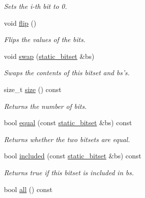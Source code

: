 \begin{DoxyCompactItemize}
\begin{DoxyCompactList}\small\item\em Sets the {\itshape i-\/th} bit to 0. \end{DoxyCompactList}\item 
void \hyperlink{classlgraph_1_1utils_1_1static__bitset_a430b19330c6f2a77f6ee15c3d652a2d6}{flip} ()
\begin{DoxyCompactList}\small\item\em Flips the values of the bits. \end{DoxyCompactList}\item 
void \hyperlink{classlgraph_1_1utils_1_1static__bitset_ae1737eb8f5aed69b6dd69c75334ef23a}{swap} (\hyperlink{classlgraph_1_1utils_1_1static__bitset}{static\-\_\-bitset} \&bs)
\begin{DoxyCompactList}\small\item\em Swaps the contents of this bitset and {\itshape bs's}. \end{DoxyCompactList}\item 
size\-\_\-t \hyperlink{classlgraph_1_1utils_1_1static__bitset_a5e48518dc9d46c06338166c85f5f2cc3}{size} () const 
\begin{DoxyCompactList}\small\item\em Returns the number of bits. \end{DoxyCompactList}\item 
bool \hyperlink{classlgraph_1_1utils_1_1static__bitset_a071225c9851b9e3bbfdb778b9e20f303}{equal} (const \hyperlink{classlgraph_1_1utils_1_1static__bitset}{static\-\_\-bitset} \&bs) const 
\begin{DoxyCompactList}\small\item\em Returns whether the two bitsets are equal. \end{DoxyCompactList}\item 
bool \hyperlink{classlgraph_1_1utils_1_1static__bitset_a789f2ac0b02c7ecc2e18f6e7a5374869}{included} (const \hyperlink{classlgraph_1_1utils_1_1static__bitset}{static\-\_\-bitset} \&bs) const 
\begin{DoxyCompactList}\small\item\em Returns true if this bitset is included in {\itshape bs}. \end{DoxyCompactList}\item 
\hypertarget{classlgraph_1_1utils_1_1static__bitset_a7dd02f04251cc020b8f24085e2bc33d3}{bool \hyperlink{classlgraph_1_1utils_1_1static__bitset_a7dd02f04251cc020b8f24085e2bc33d3}{all} () const }\label{classlgraph_1_1utils_1_1static__bitset_a7dd02f04251cc020b8f24085e2bc33d3}


\end{DoxyCompactItemize}
